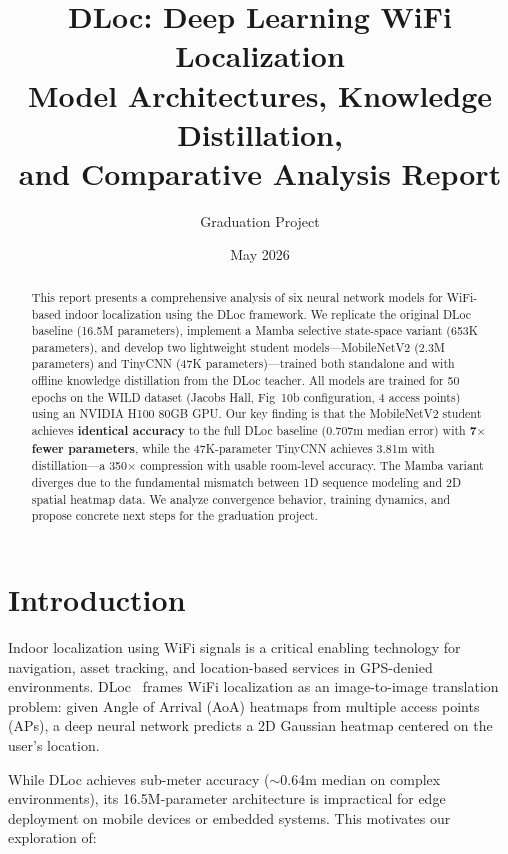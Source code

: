 \documentclass[11pt,a4paper]{article}
\title{%
\textbf{DLoc: Deep Learning WiFi Localization}\\[0.3em]
\Large Model Architectures, Knowledge Distillation,\\and Comparative Analysis Report}
\author{Graduation Project}
\date{May 2026}
\begin{document}
\maketitle
\thispagestyle{empty}

\begin{abstract}
This report presents a comprehensive analysis of six neural network models for WiFi-based indoor localization using the DLoc framework. We replicate the original DLoc baseline (16.5M parameters), implement a Mamba selective state-space variant (653K parameters), and develop two lightweight student models---MobileNetV2 (2.3M parameters) and TinyCNN (47K parameters)---trained both standalone and with offline knowledge distillation from the DLoc teacher. All models are trained for 50 epochs on the WILD dataset (Jacobs Hall, Fig~10b configuration, 4 access points) using an NVIDIA H100 80GB GPU. Our key finding is that the MobileNetV2 student achieves \textbf{identical accuracy} to the full DLoc baseline (0.707m median error) with \textbf{7$\times$ fewer parameters}, while the 47K-parameter TinyCNN achieves 3.81m with distillation---a 350$\times$ compression with usable room-level accuracy. The Mamba variant diverges due to the fundamental mismatch between 1D sequence modeling and 2D spatial heatmap data. We analyze convergence behavior, training dynamics, and propose concrete next steps for the graduation project.
\end{abstract}

\tableofcontents
\newpage

\section{Introduction}

Indoor localization using WiFi signals is a critical enabling technology for navigation, asset tracking, and location-based services in GPS-denied environments. DLoc~\cite{dloc2020} frames WiFi localization as an image-to-image translation problem: given Angle of Arrival (AoA) heatmaps from multiple access points (APs), a deep neural network predicts a 2D Gaussian heatmap centered on the user's location.

While DLoc achieves sub-meter accuracy ($\sim$0.64m median on complex environments), its 16.5M-parameter architecture is impractical for edge deployment on mobile devices or embedded systems. This motivates our exploration of:
\end{document}
